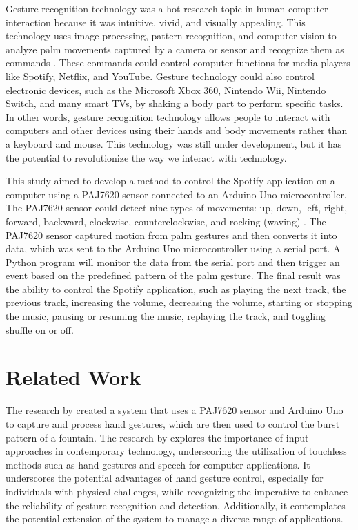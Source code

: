 \documentclass[conference,a4paper]{IEEEtran}
\begin{document}
Gesture recognition technology was a hot research topic in human-computer interaction because it was intuitive, vivid, and visually appealing. This technology uses image processing, pattern recognition, and computer vision to analyze palm movements captured by a camera or sensor and recognize them as commands  \cite{vidyagesture}. These commands could control computer functions for media players like Spotify, Netflix, and YouTube. Gesture technology could also control electronic devices, such as the Microsoft Xbox 360, Nintendo Wii, Nintendo Switch, and many smart TVs, by shaking a body part to perform specific tasks. In other words, gesture recognition technology allows people to interact with computers and other devices using their hands and body movements rather than a keyboard and mouse. This technology was still under development, but it has the potential to revolutionize the way we interact with technology.

This study aimed to develop a method to control the Spotify application on a computer using a PAJ7620 sensor connected to an Arduino Uno microcontroller. The PAJ7620 sensor could detect nine types of movements: up, down, left, right, forward, backward, clockwise, counterclockwise, and rocking (waving) \cite{pixart} \cite{taufikproto}. The PAJ7620 sensor captured motion from palm gestures and then converts it into data, which was sent to the Arduino Uno microcontroller using a serial port. A Python program will monitor the data from the serial port and then trigger an event based on the predefined pattern of the palm gesture. The final result was the ability to control the Spotify application, such as playing the next track, the previous track, increasing the volume, decreasing the volume, starting or stopping the music, pausing or resuming the music, replaying the track, and toggling shuffle on or off.


\vspace{7pt}
\section{Related Work}
The research by \cite{rahmifountain} created a system that uses a PAJ7620 sensor and Arduino Uno to capture and process hand gestures, which are then used to control the burst pattern of a fountain. The research by \cite{SHARMA2015721} explores the importance of input approaches in contemporary technology, underscoring the utilization of touchless methods such as hand gestures and speech for computer applications. It underscores the potential advantages of hand gesture control, especially for individuals with physical challenges, while recognizing the imperative to enhance the reliability of gesture recognition and detection. Additionally, it contemplates the potential extension of the system to manage a diverse range of applications.
\end{document}
